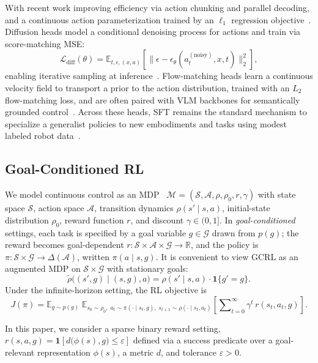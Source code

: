With recent work improving efficiency via action chunking and parallel decoding, and a continuous action parameterization trained by an $\ell_1$ regression
objective~\citep{openvla-oft}. 
Diffusion heads model a conditional denoising
process for actions and train via score-matching MSE:
\[
\mathcal{L}_{\text{diff}}(\theta)
= \mathbb{E}_{t,\epsilon,(x,a)}\!\left[\big\|\epsilon - \epsilon_{\theta}(a_t^{(\text{noisy})}, x, t)\big\|_2^2\right],
\]
enabling iterative sampling at inference~\citep{team2024octo,chi2024diffusionpolicy}. 
Flow-matching heads learn a continuous velocity field to
transport a prior to the action distribution, trained with an $L_2$ flow-matching loss,
and are often paired with VLM backbones for semantically grounded control~\citep{black2024pi0, intelligence2025pi05}. 
Across these heads, SFT remains the standard mechanism to specialize a generalist
policies to new embodiments and tasks using modest labeled robot data~\citep{kim2024openvla, openvla-oft}.


\subsection{Goal-Conditioned RL}
We model continuous control as an MDP~\citep{bellman1957MDP}
$\mathcal{M}=(\mathcal{S},\mathcal{A},\rho,\rho_0,r,\gamma)$ with state space
$\mathcal{S}$, action space $\mathcal{A}$, transition dynamics
$\rho(s'\mid s,a)$, initial-state distribution $\rho_0$, reward function $r$,
and discount $\gamma\in(0,1]$. In \emph{goal-conditioned} settings, each task
is specified by a goal variable $g\in\mathcal{G}$ drawn from $p(g)$; the reward
becomes goal-dependent $r:\mathcal{S}\times\mathcal{A}\times\mathcal{G}\to\mathbb{R}$,
and the policy is $\pi:\mathcal{S}\times\mathcal{G}\to\Delta(\mathcal{A})$,
written $\pi(a\mid s,g)$. It is convenient to view GCRL as an augmented MDP on
$\mathcal{S}\times\mathcal{G}$ with stationary goals:
\[
\tilde{\rho}\big((s',g)\mid(s,g),a\big)=\rho(s'\mid s,a)\cdot \mathbf{1}\{g'=g\}.
\]
Under the infinite-horizon setting, the RL objective is
\begin{equation}
\label{eq:gcrl-objective}
J(\pi)
= \mathbb{E}_{g \sim p(g)}\;
  \mathbb{E}_{s_0 \sim \rho_0,\;
             a_t \sim \pi(\cdot \mid s_t,g),\;
             s_{t+1} \sim \rho(\cdot \mid s_t,a_t)}
  [\sum\nolimits_{t=0}^{\infty}
 \gamma^t\, r(s_t,a_t,g)].
\end{equation}

In this paper, we consider a sparse binary reward setting, \ie $r(s,a,g)=\mathbf{1}\!\left[d\big(\phi(s),g\big)\le \varepsilon\right]$ defined via a success
predicate over a goal-relevant representation $\phi(s)$, a metric $d$, and tolerance $\varepsilon>0$.






